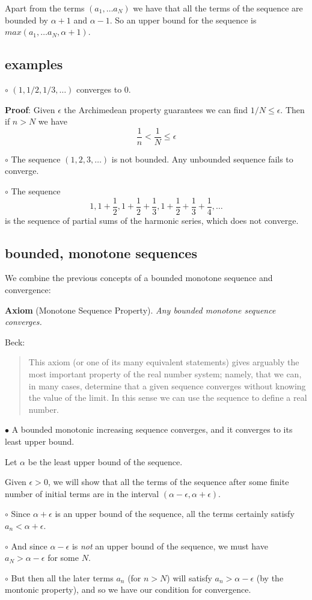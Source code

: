 \documentclass[11pt, oneside]{article}
\begin{document}
Apart from the terms $(a_1, \dots a_N)$ we have that all the terms of the sequence are bounded by $\alpha + 1$ and $\alpha - 1$.  So an upper bound for the sequence is $max(a_1, \dots a_N, \alpha + 1)$.

\subsection*{examples}

$\circ$  $(1, 1/2, 1/3, \dots)$ converges to $0$.

\textbf{Proof}:  Given $\epsilon$ the Archimedean property guarantees we can find $1/N \le \epsilon$.  Then if $n > N$ we have
\[ \frac{1}{n} < \frac{1}{N} \le \epsilon \]

$\circ$  The sequence $(1, 2, 3, \dots)$ is not bounded.  Any unbounded sequence fails to converge.

$\circ$  The sequence
\[ 1, 1 + \frac{1}{2}, 1 + \frac{1}{2} + \frac{1}{3}, 1 + \frac{1}{2} + \frac{1}{3} +  \frac{1}{4}, \dots \]
is the sequence of partial sums of the harmonic series, which does not converge.

\subsection*{bounded, monotone sequences}

We combine the previous concepts of a bounded monotone sequence and convergence:

\textbf{Axiom}  (Monotone Sequence Property). \emph{Any bounded monotone sequence converges.}

Beck:
\begin{quote}This axiom (or one of its many equivalent statements) gives arguably the most important property of the real number system; namely, that we can, in many cases, determine that a given sequence converges without knowing the value of the limit. In this sense we can use the sequence to define a real number.\end{quote}

$\bullet$  A bounded monotonic increasing sequence converges, and it converges to its least upper bound.

Let $\alpha$ be the least upper bound of the sequence.

Given $\epsilon > 0$, we will show that all the terms of the sequence after some finite number of initial terms are in the interval $(\alpha - \epsilon, \alpha + \epsilon)$.

$\circ$  Since $\alpha + \epsilon$ is an upper bound of the sequence, all the terms certainly satisfy $a_n < \alpha + \epsilon$.

$\circ$  And since $\alpha - \epsilon$ is \emph{not} an upper bound of the sequence, we must have $a_N > \alpha - \epsilon$ for some $N$.

$\circ$  But then all the later terms $a_n$ (for $n > N$)  will satisfy $a_n > \alpha - \epsilon$ (by the montonic property), and so we have our condition for convergence.
\end{document}
